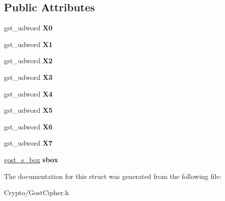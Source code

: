 \subsection*{Public Attributes}
\begin{DoxyCompactItemize}
\item 
\mbox{\label{structgost__kds_a0c977b3173927da8aab2e9b0895fdfb8}} 
gst\+\_\+udword {\bfseries X0}
\item 
\mbox{\label{structgost__kds_a461d34871c6b88e234eb270aada69837}} 
gst\+\_\+udword {\bfseries X1}
\item 
\mbox{\label{structgost__kds_af2196e149df529c4f1f85e7880dd12ae}} 
gst\+\_\+udword {\bfseries X2}
\item 
\mbox{\label{structgost__kds_a87b79b144523b9ede5355690816d1212}} 
gst\+\_\+udword {\bfseries X3}
\item 
\mbox{\label{structgost__kds_aa3c82fea0aaff8afb8d46fe372f3f651}} 
gst\+\_\+udword {\bfseries X4}
\item 
\mbox{\label{structgost__kds_af6b110b69e49473703a6395846a27daf}} 
gst\+\_\+udword {\bfseries X5}
\item 
\mbox{\label{structgost__kds_ad4d1a587d63cc9faa3894e03c7b92317}} 
gst\+\_\+udword {\bfseries X6}
\item 
\mbox{\label{structgost__kds_a5059781d122296c94fdb86d2a22204fa}} 
gst\+\_\+udword {\bfseries X7}
\item 
\mbox{\label{structgost__kds_ada84e57042c8aa1b354d5effbf3188a1}} 
\hyperlink{structgost__s__box}{gost\+\_\+s\+\_\+box} {\bfseries sbox}
\end{DoxyCompactItemize}


The documentation for this struct was generated from the following file\+:\begin{DoxyCompactItemize}
\item 
Crypto/Gost\+Cipher.\+h\end{DoxyCompactItemize}
